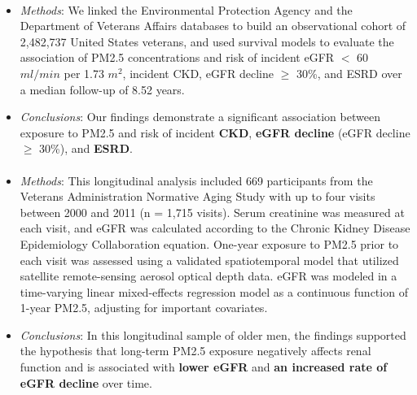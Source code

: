 \documentclass{article}
\begin{document}
\paragraph{\citet{bowe2018particulate}}
\begin{itemize}
    \item \textit{Methods}:  We linked the Environmental Protection Agency and the Department of Veterans Affairs databases to build an observational cohort of 2,482,737 United States veterans, and used survival models to evaluate the association of PM2.5 concentrations and risk of incident eGFR $<$ 60 $ml/min$ per 1.73 $m^2$, incident CKD, eGFR decline $\geq$ 30\%, and ESRD over a median follow-up of 8.52 years.
    \item \textit{Conclusions}: Our findings demonstrate a significant association between exposure to PM2.5 and risk of incident \textbf{CKD}, \textbf{eGFR decline} (eGFR decline $\geq$ 30\%), and \textbf{ESRD}.
\end{itemize}

\paragraph{\citet{mehta2016long}}
\begin{itemize}
    \item \textit{Methods}: This longitudinal analysis included 669 participants from the Veterans Administration Normative Aging Study with up to four visits between 2000 and 2011 (n = 1,715 visits). Serum creatinine was measured at each visit, and eGFR was calculated according to the Chronic Kidney Disease Epidemiology Collaboration equation. One-year exposure to PM2.5 prior to each visit was assessed using a validated spatiotemporal model that utilized satellite remote-sensing aerosol optical depth data. eGFR was modeled in a time-varying linear mixed-effects regression model as a continuous function of 1-year PM2.5, adjusting for important covariates.
    \item \textit{Conclusions}: In this longitudinal sample of older men, the findings supported the hypothesis that long-term PM2.5 exposure negatively affects renal function and is associated with \textbf{lower eGFR} and \textbf{an increased rate of eGFR decline} over time.
\end{itemize}
\end{document}
